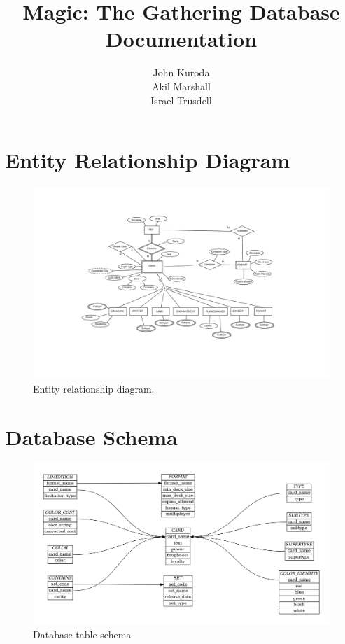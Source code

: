 \documentclass{article}
\title{Magic: The Gathering Database Documentation}
\author{John Kuroda\\Akil Marshall\\Israel Trusdell}
\begin{document}
\maketitle
\newpage
\tableofcontents
\newpage

\section{Entity Relationship Diagram}
\begin{figure}[h!] %
    \includegraphics[width=\linewidth]{../er_diagram/er_diagram.png}
    \caption{Entity relationship diagram.}
    \label{fig:er_diagram}
\end{figure}

\section{Database Schema}
\begin{figure}[h!] %
    \includegraphics[width=\linewidth]{../schema/schema.png}
    \caption{Database table schema}
    \label{fig:label}
\end{figure}
\end{document}
